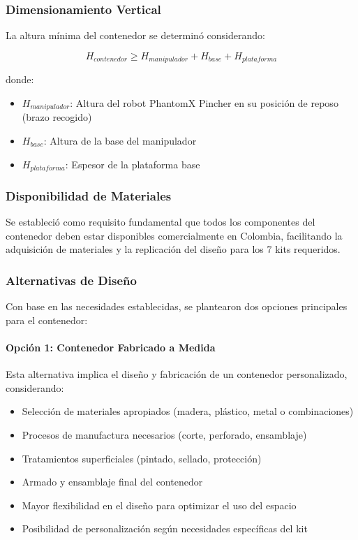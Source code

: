 \subsubsection{Dimensionamiento Vertical}

La altura mínima del contenedor se determinó considerando:

\begin{equation}
H_{contenedor} \geq H_{manipulador} + H_{base} + H_{plataforma}
\end{equation}

donde:
\begin{itemize}
    \item $H_{manipulador}$: Altura del robot PhantomX Pincher en su posición de reposo (brazo recogido)
    \item $H_{base}$: Altura de la base del manipulador
    \item $H_{plataforma}$: Espesor de la plataforma base
\end{itemize}

\subsubsection{Disponibilidad de Materiales}

Se estableció como requisito fundamental que todos los componentes del contenedor deben estar disponibles comercialmente en Colombia, facilitando la adquisición de materiales y la replicación del diseño para los 7 kits requeridos.

\subsubsection{Alternativas de Diseño}

Con base en las necesidades establecidas, se plantearon dos opciones principales para el contenedor:

\paragraph{Opción 1: Contenedor Fabricado a Medida}

Esta alternativa implica el diseño y fabricación de un contenedor personalizado, considerando:
\begin{itemize}
    \item Selección de materiales apropiados (madera, plástico, metal o combinaciones)
    \item Procesos de manufactura necesarios (corte, perforado, ensamblaje)
    \item Tratamientos superficiales (pintado, sellado, protección)
    \item Armado y ensamblaje final del contenedor
    \item Mayor flexibilidad en el diseño para optimizar el uso del espacio
    \item Posibilidad de personalización según necesidades específicas del kit
\end{itemize}

